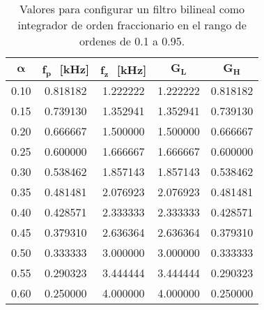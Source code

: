 \begin{table}[!hbp]                                      
\centering   
\caption{Valores para configurar un filtro bilineal como integrador de orden fraccionario en el rango de ordenes de 0.1 a 0.95.}                            
\label{tab:calculos_bilineal}                                        
\begin{tabular}{ccccc}                        
\hline                                              
$\bm{\alpha}$ & $\bm{f_{p}}\,\,$ [kHz] & $\bm{f_{z}}\,\,$ [kHz] & $\bm{G_{L}}$ & $\bm{G_{H}}$ \\            
\hline                                              
0.10 & 0.818182 & 1.222222 & 1.222222 & 0.818182 \\  
                                              
0.15 & 0.739130 & 1.352941 & 1.352941 & 0.739130 \\  
                                            
0.20 & 0.666667 & 1.500000 & 1.500000 & 0.666667 \\  
                                              
0.25 & 0.600000 & 1.666667 & 1.666667 & 0.600000 \\  
                                              
0.30 & 0.538462 & 1.857143 & 1.857143 & 0.538462 \\  
                                              
0.35 & 0.481481 & 2.076923 & 2.076923 & 0.481481 \\  
                                              
0.40 & 0.428571 & 2.333333 & 2.333333 & 0.428571 \\  
                                            
0.45 & 0.379310 & 2.636364 & 2.636364 & 0.379310 \\  
                                             
0.50 & 0.333333 & 3.000000 & 3.000000 & 0.333333 \\  
                                             
0.55 & 0.290323 & 3.444444 & 3.444444 & 0.290323 \\  
                                             
0.60 & 0.250000 & 4.000000 & 4.000000 & 0.250000 \\  
                                              

\end{tabular}
\end{table}
